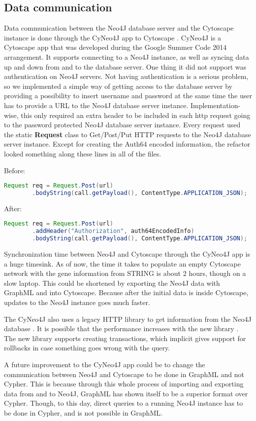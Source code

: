 \subsection{Data communication}
Data communication between the Neo4J database server and the Cytoscape instance
is done through the CyNeo4J app to Cytoscape \cite{cyneo4j}. CyNeo4J is a
Cytoscape app that was developed during the Google Summer Code 2014 arrangement.
It supports connecting to a Neo4J instance, as well as syncing data up and down
from and to the database server. One thing it did not support was authentication
on Neo4J servers. Not having authentication is a serious problem, so we
implemented a simple way of getting access to the database server by providing a
possibility to insert username and password at the same time the user has to
provide a URL to the Neo4J database server instance. Implementation-wise, this
only required an extra header to be included in each http request going to the
password protected Neo4J database server instance. Every request used the static
\textbf{Request} class to Get/Post/Put HTTP requests to the Neo4J database
server instance. Except for creating the Auth64 encoded information, the
refactor looked something along these lines in all of the files.

Before:
\begin{lstlisting}[frame=single,language=Java]
Request req = Request.Post(url)
        .bodyString(call.getPayload(), ContentType.APPLICATION_JSON);
\end{lstlisting}

After:
\begin{lstlisting}[frame=single,language=Java]
Request req = Request.Post(url)
        .addHeader("Authorization", auth64EncodedInfo)
        .bodyString(call.getPayload(), ContentType.APPLICATION_JSON);
\end{lstlisting}

Synchronization time between Neo4J and Cytoscape through the CyNeo4J app is a
huge timesink. As of now, the time it takes to populate an empty Cytoscape
network with the gene information from STRING is about 2 hours, though on a slow
laptop. This could be shortened by exporting the Neo4J data with GraphML and
into Cytoscape. Because after the initial data is inside Cytoscape, updates to
the Neo4J instance goes much faster.

The CyNeo4J also uses a legacy HTTP library to get information from the Neo4J
database \cite{legacy-neo4j}. It is possible that the performance increases with
the new library \cite{transactional-neo4j}. The new library supports creating
transactions, which implicit gives support for rollbacks in case something goes
wrong with the query.

A future improvement to the CyNeo4J app could be to change the communication
between Neo4J and Cytoscape to be done in GraphML and not Cypher. This is
because through this whole process of importing and exporting data from and to
Neo4J, GraphML has shown itself to be a superior format over Cypher. Though, to
this day, direct queries to a running Neo4J instance has to be done in Cypher,
and is not possible in GraphML.
